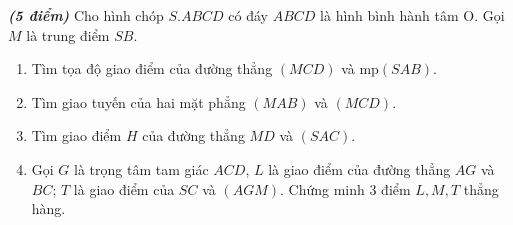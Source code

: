 	\begin {ex}  %
	\textbf{\textit{(5 điểm)}} Cho hình chóp $ S.ABCD $ có đáy $ ABCD $ là hình bình hành tâm O. Gọi $ M $  là trung điểm $ SB $.
	\begin{enumerate}
		\item Tìm tọa độ giao điểm của đường thẳng $ (MCD) $ và mp$ (SAB) $.  
		\item Tìm giao tuyến của hai mặt phẳng $ (MAB) $ và $ (MCD) $.
		\item Tìm giao điểm $ H $ của đường thẳng $ MD $ và $ (SAC) $.	
		\item Gọi $ G $ là trọng tâm tam giác $ ACD $, $ L $ là giao điểm của đường thẳng $ AG $ và $ BC $; $ T $ là giao điểm của $ SC $ và $ (AGM) $. Chứng minh 3 điểm $ L, M, T $ thẳng hàng.	
	\end{enumerate}
\end{ex}
